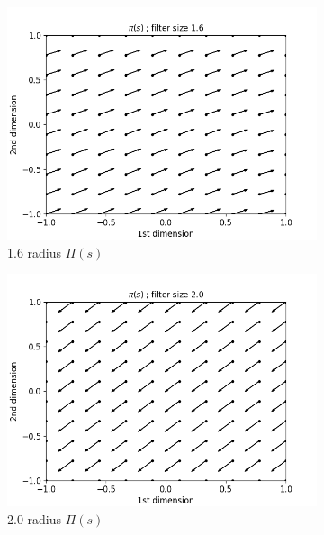\documentclass{article}
\begin{document}
 \begin{figure}[H]
  \centering
  \begin{subfigure}[b]{0.3\linewidth}
    \includegraphics[width=\linewidth]{Study_2/2.4/visualizations/Pi_arrow_1_6.png}
      \caption{1.6 radius $\Pi(s)$}
  \end{subfigure}
   \begin{subfigure}[b]{0.3\linewidth}
    \includegraphics[width=\linewidth]{Study_2/2.4/visualizations/Pi_arrow_2_0.png}
      \caption{2.0 radius $\Pi(s)$}
  \end{subfigure}
   \begin{subfigure}[b]{0.3\linewidth}

\end{subfigure}
\end{figure}
\end{document}
